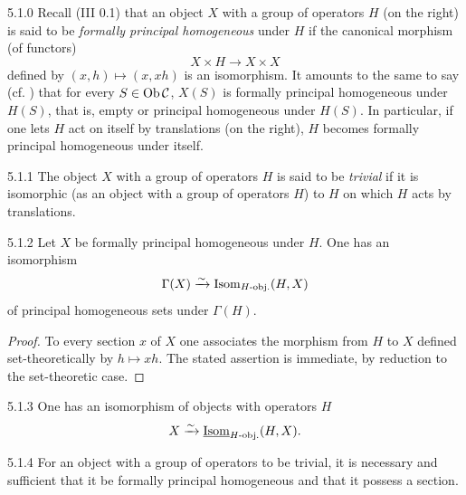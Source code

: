 \begin{definition}{5.1.0}\label{IV.5.1.0}
Recall (III 0.1) that an object \(X\) with a group of operators
\(H\) (on the right) is said to be \emph{formally principal
homogeneous} under \(H\) if the canonical morphism (of functors)
\[
X\times H\longrightarrow X\times X
\]
defined by \((x,h)\mapsto(x,xh)\) is an isomorphism.
It amounts to the same to say (cf. \loccit) that for every
\(S\in\operatorname{Ob}\mathcal C\), \(X(S)\) is formally principal
homogeneous under \(H(S)\), that is, empty or principal
homogeneous under \(H(S)\).
In particular, if one lets \(H\) act on itself by translations
(on the right), \(H\) becomes formally principal homogeneous
under itself.
\end{definition}
\begin{definition}{5.1.1}\label{IV.5.1.1}
The object \(X\) with a group of operators \(H\) is said
to be \emph{trivial} if it is isomorphic (as an object with
a group of operators \(H\)) to \(H\) on which \(H\) acts
by translations.
\end{definition}
\begin{proposition}{5.1.2}\label{IV.5.1.2}
Let \(X\) be formally principal homogeneous under \(H\).
One has an isomorphism
\[
\Gamma(X)\xrightarrow{\sim}\operatorname{Isom}_{H\text{-obj.}}(H,X)
\]
of principal homogeneous sets under \(\Gamma(H)\).
\end{proposition}
\begin{proof}
To every section \(x\) of \(X\) one associates the morphism
from \(H\) to \(X\) defined set-theoretically by \(h\mapsto xh\).
The stated assertion is immediate, by reduction to the
set-theoretic case.
\end{proof}
\begin{corollary}{5.1.3}\label{IV.5.1.3}
One has an isomorphism of objects with operators \(H\)
\[
X\xrightarrow{\sim}\underline{\operatorname{Isom}}_{H\text{-obj.}}(H,X).
\]
\end{corollary}
\begin{corollary}{5.1.4}\label{IV.5.1.4}
For an object with a group of operators to be trivial,
it is necessary and sufficient that it be formally principal
homogeneous and that it possess a section.
\end{corollary}
